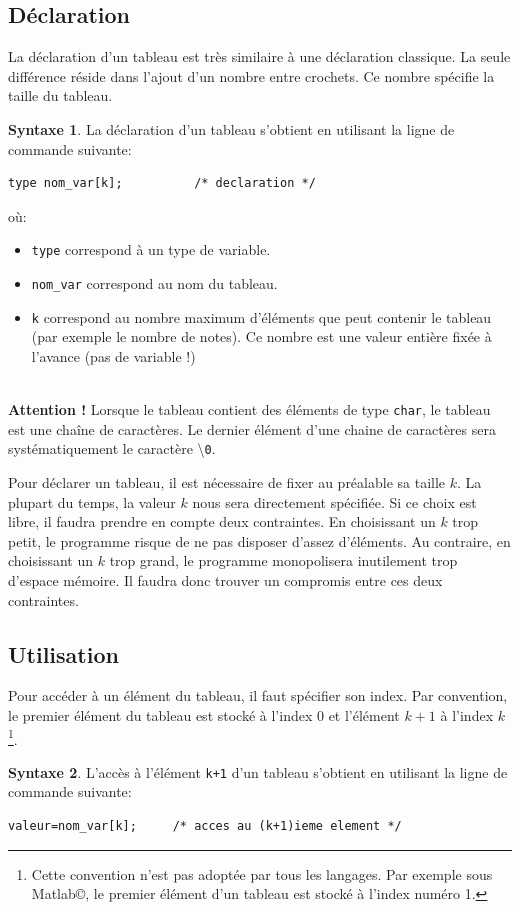 \documentclass[a4paper,11pt]{book}
\newenvironment{warning} 
   {~\\ \textbf{Attention !}}{\\}
\theoremstyle{definition}
\newtheorem*{syntaxe}{Syntaxe}
\begin{document}
\subsection{Déclaration}
La déclaration d'un tableau est très similaire à une déclaration classique. La seule différence réside dans l'ajout d'un nombre entre crochets. Ce nombre spécifie la taille du tableau.
\begin{syntaxe}La déclaration d'un tableau s'obtient en utilisant la ligne de commande suivante:
\begin{lstlisting}
type nom_var[k];          /* declaration */
\end{lstlisting}
où:
\begin{itemize}
\item \texttt{type} correspond à un type de variable. 
\item \texttt{nom\_var} correspond au nom du tableau.
\item \texttt{k} correspond au nombre maximum d'éléments que peut contenir le tableau (par exemple le nombre de notes). Ce nombre est une valeur entière fixée à l'avance (pas de variable !) 
\end{itemize}

\begin{warning}
Lorsque le tableau contient des éléments de type \texttt{char}, le tableau est une chaîne de caractères. Le dernier élément d'une chaine de caractères sera systématiquement le caractère \textbackslash \texttt{0}.
\end{warning}

\end{syntaxe}
Pour déclarer un tableau, il est nécessaire de fixer au préalable sa taille $k$. La
plupart du temps, la valeur $k$ nous sera directement spécifiée.
Si ce choix est libre, il faudra prendre en compte deux
contraintes. En choisissant un $k$ trop petit, le programme risque de ne pas disposer d'assez d'éléments. Au contraire, en choisissant un $k$ trop
grand, le programme monopolisera inutilement trop d'espace
mémoire. Il faudra donc trouver un compromis entre ces deux
contraintes.

\subsection{Utilisation}
Pour accéder à un élément du tableau, il faut spécifier son index. Par convention, le premier élément du tableau est stocké à l'index 0 et l'élément $k+1$ à l'index $k$\footnote{Cette convention n'est pas adoptée par tous les langages. Par exemple sous Matlab\copyright, le premier élément d'un tableau est stocké à l'index numéro 1.}.
\begin{syntaxe}L'accès à l'élément \texttt{k+1} d'un tableau s'obtient en utilisant la ligne de commande suivante:
\begin{lstlisting}
valeur=nom_var[k];     /* acces au (k+1)ieme element */
\end{lstlisting}
\end{syntaxe}
\end{document}
